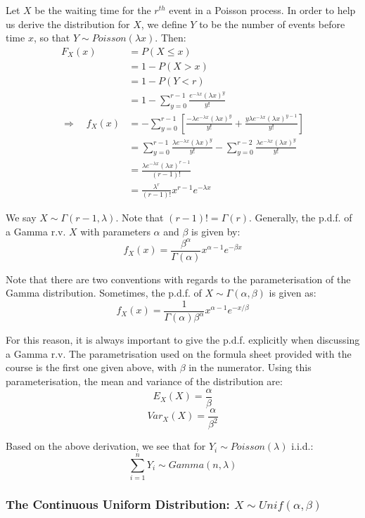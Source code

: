 \documentclass[12pt,a4paper]{article}
\begin{document}
Let $X$ be the waiting time for the $r^{th}$ event in a Poisson process. In order to help us derive the distribution for $X$, we define $Y$ to be the number of events before time $x$, so that $Y \sim Poisson(\lambda x)$. Then:
\begin{align*}
F_X(x) &= P(X\leq x)\\
&= 1 - P(X > x)\\
&= 1 - P(Y < r)\\
&= 1 - \sum_{y=0}^{r-1} \frac{e^{-\lambda x} (\lambda x)^y}{y!}\\
\Rightarrow \quad f_X(x) &= -\sum_{y=0}^{r-1}\left[\frac{-\lambda e^{-\lambda x} (\lambda x)^y}{y!} + \frac{y\lambda e^{-\lambda x}(\lambda x)^{y-1}}{y!}\right]\\
&= \sum_{y=0}^{r-1}\frac{\lambda e^{-\lambda x}(\lambda x)^y}{y!} - \sum_{y=0}^{r-2} \frac{\lambda e^{-\lambda x}(\lambda x)^y}{y!}\\
&= \frac{\lambda e^{-\lambda x}(\lambda x)^{r-1}}{(r-1)!}\\
&= \frac{\lambda^r}{(r-1)!}x^{r-1}e^{-\lambda x}
\end{align*}

We say $X \sim \Gamma(r-1,\lambda)$. Note that $(r-1)! = \Gamma(r)$. Generally, the p.d.f. of a Gamma r.v. $X$ with parameters $\alpha$ and $\beta$ is given by:
$$f_X(x) = \frac{\beta^\alpha}{\Gamma(\alpha)}x^{\alpha-1}e^{-\beta x}$$

Note that there are two conventions with regards to the parameterisation of the Gamma distribution. Sometimes, the p.d.f. of $X \sim \Gamma(\alpha,\beta)$ is given as:
$$f_X(x) = \frac{1}{\Gamma(\alpha)\beta^\alpha}x^{\alpha -1}e^{-x/\beta}$$

For this reason, it is always important to give the p.d.f. explicitly when discussing a Gamma r.v. The parametrisation used on the formula sheet provided with the course is the first one given above, with $\beta$ in the numerator. Using this parameterisation, the mean and variance of the distribution are:
$$E_{X}(X) = \frac{\alpha}{\beta}$$
$$Var_{X}(X) = \frac{\alpha}{\beta^2}$$

\noindent Based on the above derivation, we see that for $Y_i \sim Poisson(\lambda)$ i.i.d.:
$$\sum_{i=1}^n Y_i \sim Gamma(n,\lambda)$$

\subsubsection{The Continuous Uniform Distribution: $X \sim Unif(\alpha,\beta)$}
\end{document}

